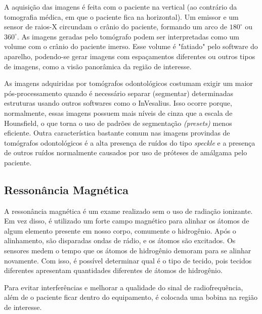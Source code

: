 A aquisição das imagens é feita com o paciente na vertical (ao contrário da tomografia médica,
em que o paciente fica na horizontal). Um emissor e um sensor de raios-X circundam o crânio
do paciente, formando um arco de $180^\circ$ ou $360^\circ$. As imagens geradas pelo tomógrafo
podem ser interpretadas como um volume com o crânio do paciente imerso. Esse volume é "fatiado"
pelo software do aparelho, podendo-se gerar imagens com espaçamentos diferentes ou outros
tipos de imagens, como a visão panorâmica da região de interesse.

As imagens adquiridas por tomógrafos odontológicos costumam exigir um maior pós-processamento
quando é necessário separar (segmentar) determinadas estruturas usando outros softwares como
o InVesalius. Isso ocorre porque, normalmente, essas imagens possuem mais níveis de cinza que
a escala de Hounsfield, o que torna o uso de padrões de segmentação \textit{(presets)} menos
eficiente. Outra característica bastante comum nas imagens provindas de tomógrafos
odontológicos é a alta presença de ruídos do tipo \textit{speckle} e a presença de outros
ruídos normalmente causados por uso de próteses de amálgama pelo paciente.


\subsection{Ressonância Magnética}

A ressonância magnética é um exame realizado sem o uso de radiação ionizante. Em vez disso,
é utilizado um forte campo magnético para alinhar os átomos de algum elemento presente em
nosso corpo, comumente o hidrogênio. Após o alinhamento, são disparadas ondas de rádio, e os
átomos são excitados. Os sensores medem o tempo que os átomos de hidrogênio demoram para se
alinhar novamente. Com isso, é possível determinar qual é o tipo de tecido, pois tecidos
diferentes apresentam quantidades diferentes de átomos de hidrogênio.

Para evitar interferências e melhorar a qualidade do sinal de radiofrequência, além de o
paciente ficar dentro do equipamento, é colocada uma bobina na região de interesse.


